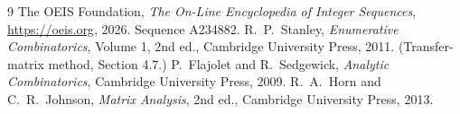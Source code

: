 \documentclass[11pt,a4paper]{article}
\theoremstyle{plain}
\theoremstyle{definition}
\begin{document}
\begin{thebibliography}{9}
 The OEIS Foundation, \emph{The On-Line Encyclopedia of Integer
Sequences}, \url{https://oeis.org}, 2026. Sequence A234882.
 R.~P.~Stanley, \emph{Enumerative Combinatorics}, Volume 1, 2nd ed.,
Cambridge University Press, 2011. (Transfer-matrix method, Section 4.7.)
 P.~Flajolet and R.~Sedgewick, \emph{Analytic Combinatorics}, Cambridge
University Press, 2009.
 R.~A.~Horn and C.~R.~Johnson, \emph{Matrix Analysis}, 2nd ed., Cambridge
University Press, 2013.
\end{thebibliography}
\end{document}
